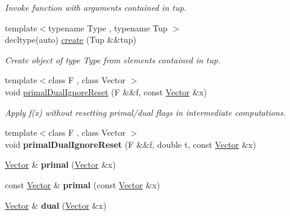 \begin{DoxyCompactItemize}
\begin{DoxyCompactList}\small\item\em Invoke function with arguments contained in tup. \end{DoxyCompactList}\item 
{\footnotesize template$<$typename Type , typename Tup $>$ }\\decltype(auto) \hyperlink{group__SpacyGroup_gae823c82326475d3cc3b166533deddf21_gae823c82326475d3cc3b166533deddf21}{create} (Tup \&\&tup)
\begin{DoxyCompactList}\small\item\em Create object of type Type from elements contained in tup. \end{DoxyCompactList}\item 
{\footnotesize template$<$class F , class Vector $>$ }\\void \hyperlink{namespaceSpacy_a86fc19860827749c1d825b689cfbc6cd_a86fc19860827749c1d825b689cfbc6cd}{primal\+Dual\+Ignore\+Reset} (F \&\&f, const \hyperlink{classSpacy_1_1Vector}{Vector} \&x)
\begin{DoxyCompactList}\small\item\em Apply f(x) without resetting primal/dual flags in intermediate computations. \end{DoxyCompactList}\item 
\hypertarget{namespaceSpacy_ab6410e7ef118eb48c8339cd91c5b647f}{}{\footnotesize template$<$class F , class Vector $>$ }\\void {\bfseries primal\+Dual\+Ignore\+Reset} (F \&\&f, double t, const \hyperlink{classSpacy_1_1Vector}{Vector} \&x)\label{namespaceSpacy_ab6410e7ef118eb48c8339cd91c5b647f}

\item 
\hypertarget{namespaceSpacy_a9723cd932bd79709ff03e4ed6c8ac1b0}{}\hyperlink{classSpacy_1_1Vector}{Vector} \& {\bfseries primal} (\hyperlink{classSpacy_1_1Vector}{Vector} \&x)\label{namespaceSpacy_a9723cd932bd79709ff03e4ed6c8ac1b0}

\item 
\hypertarget{namespaceSpacy_a99f893b9998bd0f3895b8899f54be471}{}const \hyperlink{classSpacy_1_1Vector}{Vector} \& {\bfseries primal} (const \hyperlink{classSpacy_1_1Vector}{Vector} \&x)\label{namespaceSpacy_a99f893b9998bd0f3895b8899f54be471}

\item 
\hypertarget{namespaceSpacy_a0d2c8b2c6b30c9b76efea6b67804605f}{}\hyperlink{classSpacy_1_1Vector}{Vector} \& {\bfseries dual} (\hyperlink{classSpacy_1_1Vector}{Vector} \&x)\label{namespaceSpacy_a0d2c8b2c6b30c9b76efea6b67804605f}


\end{DoxyCompactItemize}
